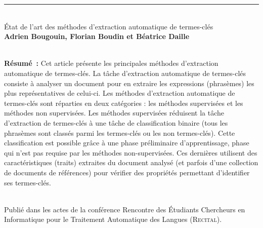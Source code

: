   \vspace{2.5em}\hrule\vspace{2.5em}

  ~\\État de l'art des méthodes d'extraction automatique de
  termes-clés\\\textbf{Adrien Bougouin, Florian Boudin et Béatrice
  Daille}\\\cite{bougouin2013stateoftheart}

  ~\\\textbf{Résumé~:}
  Cet article présente les principales méthodes d'extraction automatique de
  termes-clés. La tâche d'extraction automatique de termes-clés consiste à
  analyser un document pour en extraire les expressions (phrasèmes) les plus
  représentatives de celui-ci. Les méthodes d'extraction automatique de
  termes-clés sont réparties en deux catégories : les méthodes supervisées et
  les méthodes non supervisées. Les méthodes supervisées réduisent la tâche
  d'extraction de termes-clés à une tâche de classification binaire (tous les
  phrasèmes sont classés parmi les termes-clés ou les non termes-clés). Cette
  classification est possible grâce à une phase préliminaire d'apprentissage,
  phase qui n'est pas requise par les méthodes non-supervisées. Ces dernières
  utilisent des caractéristiques (traits) extraites du document analysé (et
  parfois d'une collection de documents de références) pour vérifier des
  propriétés permettant d'identifier ses termes-clés.

  ~\\Publié dans les actes de la conférence Rencontre des Étudiants Chercheurs en
  Informatique pour le Traitement Automatique des Langues (\textsc{Recital}).
